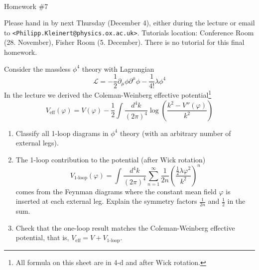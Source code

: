 \documentclass[12pt]{article}
\begin{document}
~
\vspace{-2cm}
\begin{center}
  {\Huge Homework \#7}
\end{center}
\vspace{1cm}

\noindent Please hand in by next Thursday (December 4), either during
the lecture or email to \texttt{<Philipp.Kleinert@physics.ox.ac.uk>}.
Tutorials location: Conference Room (28. November), Fisher Room
(5. December). There is no tutorial for this final homework. 
\bigskip

\noindent
Consider the massless $\phi^4$ theory with Lagrangian
\begin{equation}
  \mathcal{L} = -\frac{1}{2}\partial_\mu \phi \partial^\mu\phi
  - \frac{1}{4!}\lambda \phi^4
\end{equation}
In the lecture we derived the Coleman-Weinberg effective
potential\footnote{All formula on this sheet are in 4-d and after Wick
  rotation.}
\begin{equation}
  V_\text{eff}(\varphi) = 
  V(\varphi) 
  - \frac{1}{2}
  \int \frac{d^4k}{(2\pi)^4}
  \log\left(\frac{k^2-V''(\varphi)}{k^2}\right)
\end{equation}
\begin{enumerate}
\item Classify all 1-loop diagrams in $\phi^4$ theory (with an
  arbitrary number of external legs).
\item The 1-loop contribution to the potential (after Wick rotation)
  \begin{equation}
    V_\text{1-loop}(\varphi) = 
    \int \frac{d^4k}{(2\pi)^4}
    \sum_{n=1}^\infty \frac{1}{2n}
    \left( \frac{\tfrac{1}{2}\lambda \varphi^2}{k^2} 
    \right)^n
  \end{equation}
  comes from the Feynman diagrams where the constant mean field
  $\varphi$ is inserted at each external leg. Explain the symmetry
  factors $\frac{1}{2n}$ and $\frac{1}{2}$ in the sum.
\item Check that the one-loop result matches the Coleman-Weinberg
  effective potential, that is, $V_\text{eff} = V + V_\text{1-loop}$.
\end{enumerate}
\end{document}
